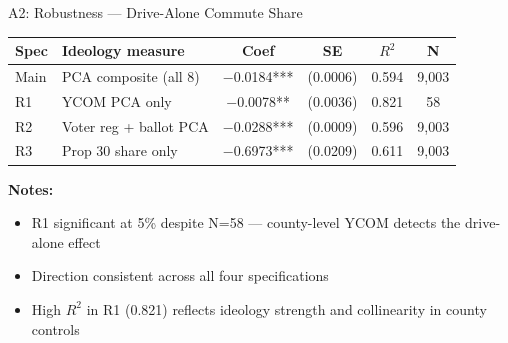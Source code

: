 \documentclass[aspectratio=169,t]{beamer}
\begin{document}
\begin{frame}{A2: Robustness --- Drive-Alone Commute Share}
  \begin{center}
  \begin{tabular}{llcccc}
    \toprule
    \textbf{Spec} & \textbf{Ideology measure} & \textbf{Coef} & \textbf{SE} & \textbf{$R^2$} & \textbf{N} \\
    \midrule
    Main & PCA composite (all 8)  & $-$0.0184*** & (0.0006) & 0.594 & 9,003 \\
    R1   & YCOM PCA only          & $-$0.0078**  & (0.0036) & 0.821 & 58 \\
    R2   & Voter reg + ballot PCA & $-$0.0288*** & (0.0009) & 0.596 & 9,003 \\
    R3   & Prop 30 share only     & $-$0.6973*** & (0.0209) & 0.611 & 9,003 \\
    \bottomrule
  \end{tabular}
  \end{center}

  \vspace{0.4em}
  \textbf{Notes:}
  \begin{itemize}
    \item R1 significant at 5\% despite N=58 --- county-level YCOM detects the drive-alone effect
    \item Direction consistent across all four specifications
    \item High $R^2$ in R1 (0.821) reflects ideology strength and collinearity in county controls
  \end{itemize}
\end{frame}

\end{document}
